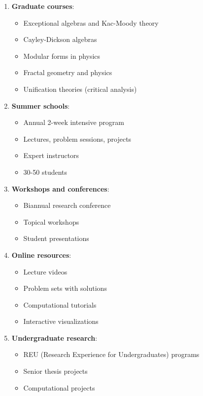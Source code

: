 \begin{enumerate}
    \item \textbf{Graduate courses}:
    \begin{itemize}
        \item Exceptional algebras and Kac-Moody theory
        \item Cayley-Dickson algebras
        \item Modular forms in physics
        \item Fractal geometry and physics
        \item Unification theories (critical analysis)
    \end{itemize}

    \item \textbf{Summer schools}:
    \begin{itemize}
        \item Annual 2-week intensive program
        \item Lectures, problem sessions, projects
        \item Expert instructors
        \item 30-50 students
    \end{itemize}

    \item \textbf{Workshops and conferences}:
    \begin{itemize}
        \item Biannual research conference
        \item Topical workshops
        \item Student presentations
    \end{itemize}

    \item \textbf{Online resources}:
    \begin{itemize}
        \item Lecture videos
        \item Problem sets with solutions
        \item Computational tutorials
        \item Interactive visualizations
    \end{itemize}

    \item \textbf{Undergraduate research}:
    \begin{itemize}
        \item REU (Research Experience for Undergraduates) programs
        \item Senior thesis projects
        \item Computational projects
    \end{itemize}
\end{enumerate}

